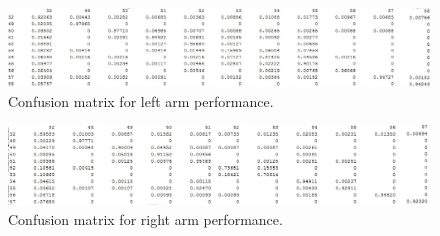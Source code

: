 \documentclass{sig-alternate}
\begin{document}




\begin{figure}[t]
\begin{center}
  \includegraphics[width=1.0\linewidth]{visual_results/nConfkNN_left.jpg}
\end{center}
  \caption{Confusion matrix for left arm performance.}
  \label{fig:conf_left}
\end{figure}

\begin{figure}
\begin{center}
  \includegraphics[width=1.0\linewidth]{visual_results/nConfkNN_right.jpg}
\end{center}
  \caption{Confusion matrix for right arm performance.}
  \label{fig:conf_right}
\end{figure}
\end{document}
